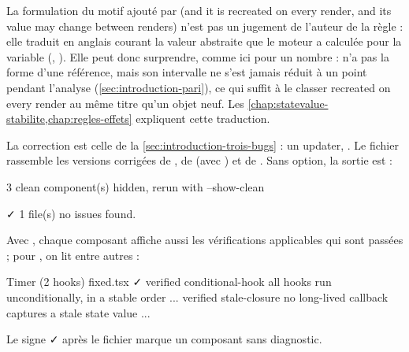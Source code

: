 \begin{piege}
  La formulation du motif ajouté par  (\og and it is
  recreated on every render\fg{}, \og and its value may change between
  renders\fg{}) n'est pas un jugement de l'auteur de la règle : elle traduit
  en anglais courant la valeur abstraite que le moteur a calculée pour la
  variable (, ).
  Elle peut donc surprendre, comme ici pour un nombre :  n'a
  pas la forme d'une référence, mais son intervalle ne s'est jamais réduit à
  un point pendant l'analyse (\cref{sec:introduction-pari}), ce qui suffit à
  le classer \og recreated on every render\fg{} au même titre qu'un objet
  neuf. Les \cref{chap:statevalue-stabilite,chap:regles-effets}
  expliquent cette traduction.
\end{piege}

La correction est celle de la \cref{sec:introduction-trois-bugs} : un updater,
. Le fichier 
rassemble les versions corrigées de , de  (avec
\code{[userId]}) et de . Sans option, la sortie est :

\begin{sortie}
   3 clean component(s) hidden, rerun with --show-clean

✓  1 file(s) no issues found.
\end{sortie}

Avec , chaque composant affiche aussi les
vérifications applicables qui sont passées ; pour , on lit entre
autres :

\begin{sortie}
  Timer  (2 hooks)  fixed.tsx  ✓
    verified  conditional-hook  all hooks run unconditionally, in a stable order
    ...
    verified  stale-closure  no long-lived callback captures a stale state value
    ...
\end{sortie}

Le signe ✓ après le fichier marque un composant sans diagnostic.

